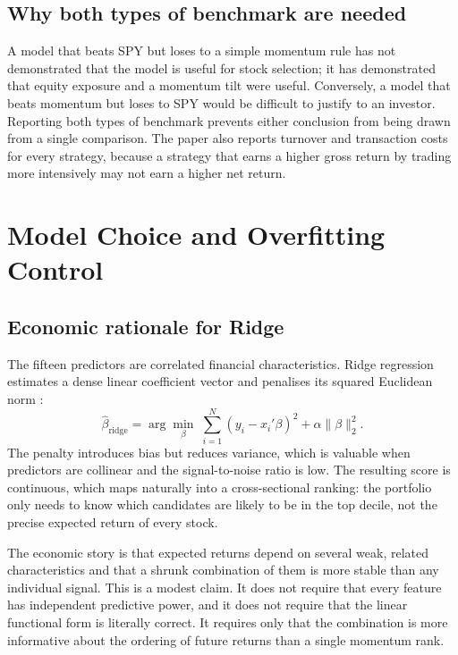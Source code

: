 \documentclass[11pt,a4paper]{article}
\begin{document}
\subsection{Why both types of benchmark are needed}

A model that beats SPY but loses to a simple momentum rule has not demonstrated that the model is useful for stock selection; it has demonstrated that equity exposure and a momentum tilt were useful. Conversely, a model that beats momentum but loses to SPY would be difficult to justify to an investor. Reporting both types of benchmark prevents either conclusion from being drawn from a single comparison. The paper also reports turnover and transaction costs for every strategy, because a strategy that earns a higher gross return by trading more intensively may not earn a higher net return.


\section{Model Choice and Overfitting Control}
\label{sec:model}

\subsection{Economic rationale for Ridge}

The fifteen predictors are correlated financial characteristics. Ridge regression estimates a dense linear coefficient vector and penalises its squared Euclidean norm \citep{hoerl1970}:
\begin{equation}
\hat{\beta}_{\text{ridge}}=\arg\min_{\beta}\;\sum_{i=1}^{N}\left(y_i-x_i'\beta\right)^2+\alpha\|\beta\|_2^2 .
\label{eq:ridge}
\end{equation}
The penalty introduces bias but reduces variance, which is valuable when predictors are collinear and the signal-to-noise ratio is low. The resulting score is continuous, which maps naturally into a cross-sectional ranking: the portfolio only needs to know which candidates are likely to be in the top decile, not the precise expected return of every stock.

The economic story is that expected returns depend on several weak, related characteristics and that a shrunk combination of them is more stable than any individual signal. This is a modest claim. It does not require that every feature has independent predictive power, and it does not require that the linear functional form is literally correct. It requires only that the combination is more informative about the ordering of future returns than a single momentum rank.
\end{document}
